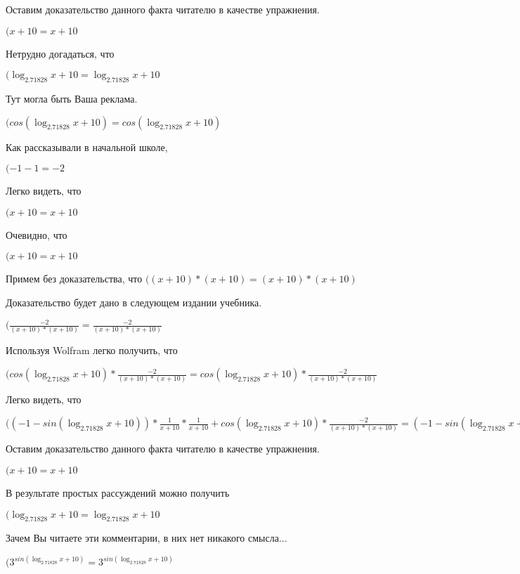 \documentclass[12pt,a4paper,fleqn]{article}
\theoremstyle{definition}
\begin{document}
Оставим доказательство данного факта читателю в качестве упражнения.

$( x  +  10  =  x  +  10 $

Нетрудно догадаться, что

$(\log_{ 2.71828 }{ x  +  10 } = \log_{ 2.71828 }{ x  +  10 }$

Тут могла быть Ваша реклама.

$(cos(\log_{ 2.71828 }{ x  +  10 }) = cos(\log_{ 2.71828 }{ x  +  10 })$

Как рассказывали в начальной школе,

$( -1  -  1  =  -2 $

Легко видеть, что

$( x  +  10  =  x  +  10 $

Очевидно, что

$( x  +  10  =  x  +  10 $

Примем без доказательства, что
$(( x  +  10 ) * ( x  +  10 ) = ( x  +  10 ) * ( x  +  10 )$

Доказательство будет дано в следующем издании учебника.

$(\frac{ -2 }{( x  +  10 ) * ( x  +  10 )}
 = \frac{ -2 }{( x  +  10 ) * ( x  +  10 )}
$

Используя Wolfram легко получить, что

$(cos(\log_{ 2.71828 }{ x  +  10 }) * \frac{ -2 }{( x  +  10 ) * ( x  +  10 )}
 = cos(\log_{ 2.71828 }{ x  +  10 }) * \frac{ -2 }{( x  +  10 ) * ( x  +  10 )}
$

Легко видеть, что

$(( -1  - sin(\log_{ 2.71828 }{ x  +  10 })) * \frac{ 1 }{ x  +  10 }
 * \frac{ 1 }{ x  +  10 }
 + cos(\log_{ 2.71828 }{ x  +  10 }) * \frac{ -2 }{( x  +  10 ) * ( x  +  10 )}
 = ( -1  - sin(\log_{ 2.71828 }{ x  +  10 })) * \frac{ 1 }{ x  +  10 }
 * \frac{ 1 }{ x  +  10 }
 + cos(\log_{ 2.71828 }{ x  +  10 }) * \frac{ -2 }{( x  +  10 ) * ( x  +  10 )}
$

Оставим доказательство данного факта читателю в качестве упражнения.

$( x  +  10  =  x  +  10 $

В результате простых рассуждений можно получить

$(\log_{ 2.71828 }{ x  +  10 } = \log_{ 2.71828 }{ x  +  10 }$

Зачем Вы читаете эти комментарии, в них нет никакого смысла...

$({ 3 }^{sin(\log_{ 2.71828 }{ x  +  10 })} = { 3 }^{sin(\log_{ 2.71828 }{ x  +  10 })}$
\end{document}
